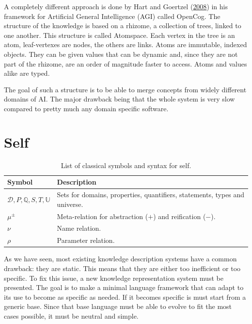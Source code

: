 \documentclass[11pt,a4paper,twoside,openright,titlepage,numbers=noenddot,headinclude,cleardoublepage=empty,openany]{scrreprt}
\theoremstyle{plain}
\theoremstyle{definition}
\theoremstyle{remark}
\newcommand{\bb}{\mathbb}
\renewcommand{\cal}{\mathcal}
\begin{document}
A completely different approach is done by Hart and Goertzel
(\protect\hyperlink{ref-hart_opencog_2008}{2008}) in his framework for
Artificial General Intelligence (AGI) called OpenCog. The structure of
the knowledge is based on a rhizome, a collection of trees, linked to
one another. This structure is called Atomspace. Each vertex in the tree
is an atom, leaf-vertexes are nodes, the others are links. Atoms are
immutable, indexed objects. They can be given values that can be dynamic
and, since they are not part of the rhizome, are an order of magnitude
faster to access. Atoms and values alike are typed.

The goal of such a structure is to be able to merge concepts from widely
different domains of AI. The major drawback being that the whole system
is very slow compared to pretty much any domain specific software.

\hypertarget{self}{%
\section{Self}\label{self}}

\hypertarget{tbl:self}{}
\begin{table}\footnotesize
\centering

\caption{\label{tbl:self}List of classical symbols and syntax for self.}

\begin{tabular}{@{}ll@{}}
\toprule

\textbf{Symbol} & \textbf{Description} \\\midrule

\(\cal{D}, P, \bb{Q}, S, T, \bb{U}\) & Sets for domains, properties,
quantifiers, statements, types and universe. \\
\(\mu^\pm\) & Meta-relation for abstraction (\(+\)) and reification
(\(\minus\)). \\
\(\nu\) & Name relation. \\
\(\rho\) & Parameter relation. \\

\bottomrule
\end{tabular}

\end{table}

As we have seen, most existing knowledge description systems have a
common drawback: they are static. This means that they are either too
inefficient or too specific. To fix this issue, a new knowledge
representation system must be presented. The goal is to make a minimal
language framework that can adapt to its use to become as specific as
needed. If it becomes specific is must start from a generic base. Since
that base language must be able to evolve to fit the most cases
possible, it must be neutral and simple.
\end{document}
